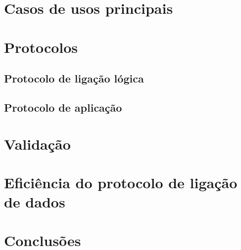 \documentclass{report}
\begin{document}
{\let\clearpage\relax \chapter{Casos de usos principais}}

\chapter{Protocolos}

\section{Protocolo de ligação lógica}

\section{Protocolo de aplicação}

\chapter{Validação}

\chapter{Eficiência do protocolo de ligação de dados}

\chapter{Conclusões}
\end{document}
